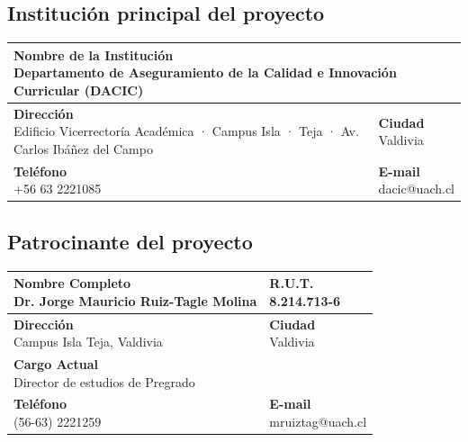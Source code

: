 \documentclass[12pt]{article}
\begin{document}
		\subsection{Institución principal del proyecto}
		\begin{large}
			\begin{tabular}{|l|l|}
				\hline
				
					\multicolumn{2}{|p{15cm}|}{ \parbox[t]{15cm}{ {\bf Nombre de la Institución} \\	 Departamento de Aseguramiento de la Calidad e Innovación Curricular (DACIC)}}\\ 
				\hline
				{ \parbox[t]{8cm}{ {\bf Dirección} \\Edificio Vicerrectoría Académica · Campus Isla · Teja · Av. Carlos Ibáñez del Campo}} & { \parbox[t]{8cm}{ {\bf Ciudad} \\	Valdivia}}
		\\ 
		
				\hline
				{ \parbox[t]{8cm}{ {\bf Teléfono} \\	+56 63 2221085}} & { \parbox[t]{8cm}{ {\bf E-mail} \\  dacic@uach.cl}}
		\\ 
		
				\hline

			\end{tabular}
		\end{large}




		\subsection{Patrocinante del proyecto}
		\begin{large}
			\begin{tabular}{|l|l|}
				\hline
				
			{ \parbox[t]{7cm}{ {\bf Nombre Completo} \\	Dr. Jorge Mauricio Ruiz-Tagle Molina}}& { \parbox[t]{7cm}{ {\bf R.U.T.} \\	8.214.713-6}}\\ 
				\hline
				{ \parbox[t]{8cm}{ {\bf Dirección} \\	Campus Isla Teja, Valdivia}} & { \parbox[t]{8cm}{ {\bf Ciudad} \\	Valdivia}}
		\\ 
		\hline
							\multicolumn{2}{|p{15cm}|}{ \parbox[t]{15cm}{ {\bf Cargo Actual} \\ Director de estudios de Pregrado }}\\ 
							
				\hline
				{ \parbox[t]{8cm}{ {\bf Teléfono} \\ (56-63) 2221259	}} & { \parbox[t]{8cm}{ {\bf E-mail} \\ mruiztag@uach.cl}}
		\\ 
		
				\hline

			\end{tabular}
		\end{large}
	
\end{document}
